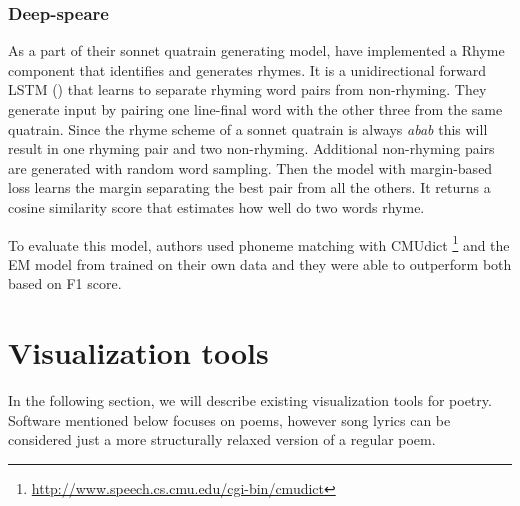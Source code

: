 \subsubsection*{Deep-speare}
As a part of their \gls{sonnet} \gls{quatrain} generating model, \cite{lau2018deep} have implemented a Rhyme component that identifies and generates rhymes. It is a unidirectional forward \gls{LSTM} (\cite{hochreiter1997long}) that learns to separate rhyming word pairs from non-rhyming. They generate input by pairing one line-final word with the other three from the same quatrain. Since the rhyme scheme of a \gls{sonnet} \gls{quatrain} is always \textit{abab} this will result in one rhyming pair and two non-rhyming. Additional non-rhyming pairs are generated with random word sampling. Then the model with margin-based loss learns the margin separating the best pair from all the others. It returns a cosine similarity score that estimates how well do two words rhyme.

To evaluate this model, authors used phoneme matching with CMUdict \footnote{\url{http://www.speech.cs.cmu.edu/cgi-bin/cmudict}} and the EM model from \cite{reddy2011unsupervised} trained on their own data and they were able to outperform both based on F1 score.



\section{Visualization tools}
In the following section, we will describe existing visualization tools for poetry. Software mentioned below focuses on poems, however song lyrics can be considered just a more structurally relaxed version of a regular poem.
